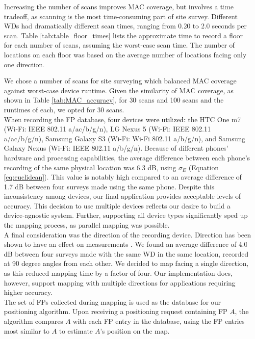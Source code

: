 \documentclass[conference]{IEEEtran}
\begin{document}
\indent Increasing the number of scans improves MAC coverage, but involves a time tradeoff, as scanning is the most time-consuming part of site survey. Different WDs had dramatically different scan times, ranging from 0.20 to 2.0 seconds per scan. Table \ref{tab:table_floor_times} lists the approximate time to record a floor for each number of scans, assuming the worst-case scan time. The number of locations on each floor was based on the average number of locations facing only one direction.



\indent We chose a number of scans for site surveying which balanced MAC coverage against worst-case device runtime. Given the similarity of MAC coverage, as shown in Table \ref{tab:MAC_accuracy}, for 30 scans and 100 scans and the runtimes of each, we opted for 30 scans.\\
\indent When recording the FP database, four devices were utilized: the HTC One m7 (Wi-Fi: IEEE 802.11 a/ac/b/g/n), LG Nexus 5  (Wi-Fi: IEEE 802.11 a/ac/b/g/n), Samsung Galaxy S3 (Wi-Fi: Wi-Fi 802.11 a/b/g/n), and Samsung Galaxy Nexus (Wi-Fi: IEEE 802.11 a/b/g/n). Because of different phones' hardware and processing capabilities, the average difference between each phone's recording of the same physical location was 6.3 dB, using $\sigma_E$ (Equation \ref{eq:euclidean}). This value is notably high compared to an average difference of 1.7 dB between four surveys made using the same phone. Despite this inconsistency among devices, our final application provides acceptable levels of accuracy. This decision to use multiple devices reflects our desire to build a device-agnostic system. Further, supporting all device types significantly sped up the mapping process, as parallel mapping was possible.\\
\indent A final consideration was the direction of the recording device. Direction has been shown to have an effect on measurements \cite{Sayad}. We found an average difference of 4.0 dB between four surveys made with the same WD in the same location, recorded at 90 degree angles from each other. We decided to map facing a single direction, as this reduced mapping time by a factor of four. Our implementation does, however, support mapping with multiple directions for applications requiring higher accuracy.\\
\indent The set of FPs collected during mapping is used as the database for our positioning algorithm. Upon receiving a positioning request containing FP $A$, the algorithm compares $A$ with each FP entry in the database, using the FP entries most similar to $A$ to estimate $A$'s position on the map.
\end{document}
